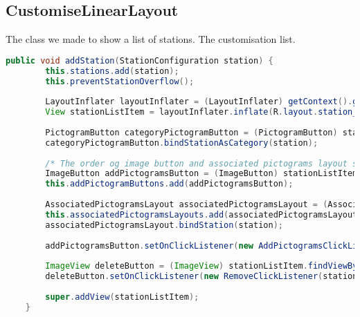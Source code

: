 \subsection*{CustomiseLinearLayout}
The class we made to show a list of stations. The customisation list.

\begin{lstlisting}[language=java,firstnumber=1,caption={The method to add a station to the list},label=lst:addstation]
public void addStation(StationConfiguration station) {
        this.stations.add(station);
        this.preventStationOverflow();
        
        LayoutInflater layoutInflater = (LayoutInflater) getContext().getSystemService(Context.LAYOUT_INFLATER_SERVICE);
        View stationListItem = layoutInflater.inflate(R.layout.station_list_item, null);
        
        PictogramButton categoryPictogramButton = (PictogramButton) stationListItem.findViewById(R.id.list_category);
        categoryPictogramButton.bindStationAsCategory(station);
        
        /* The order og image button and associated pictograms layout statements, are very important here */
        ImageButton addPictogramsButton = (ImageButton) stationListItem.findViewById(R.id.addPictogramButton);
        this.addPictogramButtons.add(addPictogramsButton);
        
        AssociatedPictogramsLayout associatedPictogramsLayout = (AssociatedPictogramsLayout) stationListItem.findViewById(R.id.associatedPictograms);
        this.associatedPictogramsLayouts.add(associatedPictogramsLayout);
        associatedPictogramsLayout.bindStation(station);
        
        addPictogramsButton.setOnClickListener(new AddPictogramsClickListener(associatedPictogramsLayout));
        
        ImageView deleteButton = (ImageView) stationListItem.findViewById(R.id.deleteRowButton);
        deleteButton.setOnClickListener(new RemoveClickListener(station));
        
        super.addView(stationListItem);
    }
\end{lstlisting}
